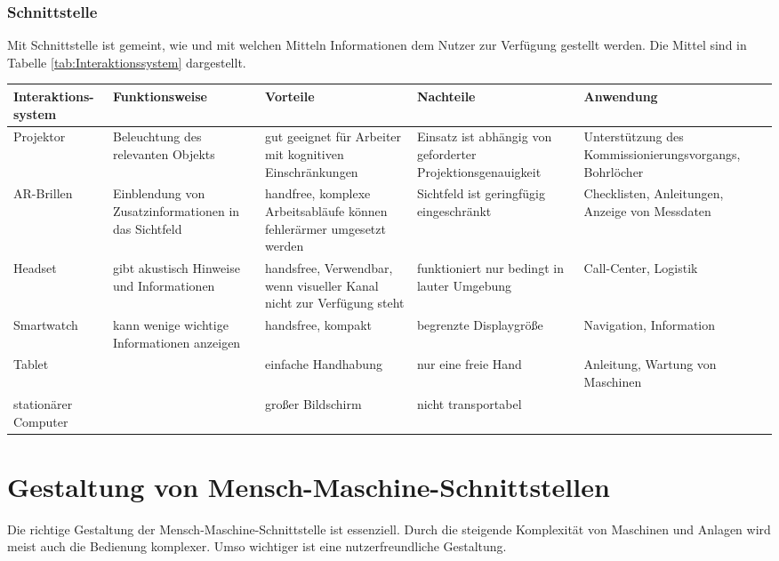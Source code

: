 \subsubsection*{Schnittstelle}
Mit Schnittstelle ist gemeint, wie und mit welchen Mitteln Informationen dem Nutzer zur Verfügung gestellt werden. Die Mittel sind in Tabelle \ref{tab:Interaktionssystem} dargestellt.

\begin{sidewaystable}
\begin{tabular}{p{}|p{}|p{}|p{}|p{}}
	\textbf{Interaktions-system} & \textbf{Funktionsweise} & \textbf{Vorteile} & \textbf{Nachteile} & \textbf{Anwendung} \\
	\hline
	Projektor & Beleuchtung des relevanten Objekts & gut geeignet für Arbeiter mit kognitiven Einschränkungen & Einsatz ist abhängig von geforderter Projektionsgenauigkeit & Unterstützung des Kommissionierungsvorgangs, Bohrlöcher \\
	\hline
	AR-Brillen & Einblendung von Zusatzinformationen in das Sichtfeld & handfree, komplexe Arbeitsabläufe können fehlerärmer umgesetzt werden & Sichtfeld ist geringfügig eingeschränkt & Checklisten, Anleitungen, Anzeige von Messdaten \\
	\hline
	Headset & gibt akustisch Hinweise und Informationen & handsfree, Verwendbar, wenn visueller Kanal nicht zur Verfügung steht & funktioniert nur bedingt in lauter Umgebung & Call-Center, Logistik \\
	\hline
	Smartwatch & kann wenige wichtige Informationen anzeigen & handsfree, kompakt & begrenzte Displaygröße & Navigation, Information \\
	\hline
	Tablet & & einfache Handhabung & nur eine freie Hand & Anleitung, Wartung von Maschinen\\
	\hline
	stationärer Computer & & großer Bildschirm & nicht transportabel & \\
\end{tabular}
\label{tab:Interaktionssystem}
\caption{Interaktionssysteme zur Bereitstellung von Informationen}
\end{sidewaystable}

\section{Gestaltung von Mensch-Maschine-Schnittstellen}
Die richtige Gestaltung der Mensch-Maschine-Schnittstelle ist essenziell. Durch die steigende Komplexität von Maschinen und Anlagen wird meist auch die Bedienung komplexer. Umso wichtiger ist eine nutzerfreundliche Gestaltung.
